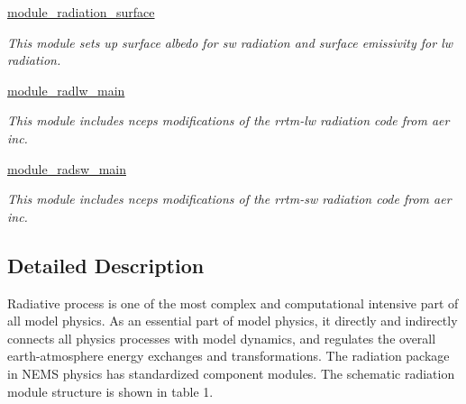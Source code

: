 \begin{DoxyCompactItemize}
\hyperlink{group__module__radiation__surface}{module\+\_\+radiation\+\_\+surface}
\begin{DoxyCompactList}\small\item\em This module sets up surface albedo for sw radiation and surface emissivity for lw radiation. \end{DoxyCompactList}\item 
\hyperlink{group__module__radlw__main}{module\+\_\+radlw\+\_\+main}
\begin{DoxyCompactList}\small\item\em This module includes ncep\textquotesingle{}s modifications of the rrtm-\/lw radiation code from aer inc. \end{DoxyCompactList}\item 
\hyperlink{group__module__radsw__main}{module\+\_\+radsw\+\_\+main}
\begin{DoxyCompactList}\small\item\em This module includes ncep\textquotesingle{}s modifications of the rrtm-\/sw radiation code from aer inc. \end{DoxyCompactList}\end{DoxyCompactItemize}


\subsection{Detailed Description}
Radiative process is one of the most complex and computational intensive part of all model physics. As an essential part of model physics, it directly and indirectly connects all physics processes with model dynamics, and regulates the overall earth-\/atmosphere energy exchanges and transformations. The radiation package in N\+E\+MS physics has standardized component modules. The schematic radiation module structure is shown in table 1.


